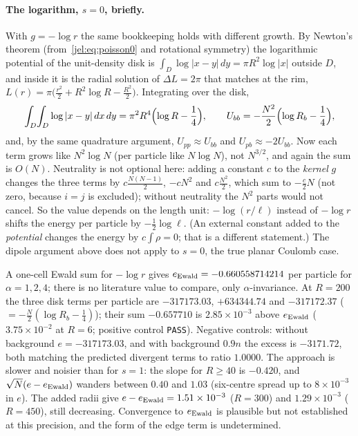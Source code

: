 \paragraph{The logarithm, $s=0$, briefly.} \tierC{} With $g=-\log r$ the same bookkeeping holds with different
growth. By Newton's theorem (from~\eqref{jel:eq:poisson0} and rotational symmetry) the logarithmic potential of the
unit-density disk is $\int_D\log|x-y|\,dy=\pi R^2\log|x|$ outside $D$, and inside it is the radial solution of
$\Delta L=2\pi$ that matches at the rim, $L(r)=\pi\bigl(\frac{r^2}2+R^2\log R-\frac{R^2}2\bigr)$. Integrating over the
disk,
\[
\int_D\!\int_D\log|x-y|\,dx\,dy=\pi^2R^4\Bigl(\log R-\frac14\Bigr),\qquad
U_{bb}=-\frac{N^2}2\Bigl(\log R_b-\frac14\Bigr),
\]
and, by the same quadrature argument, $U_{pp}\approx U_{bb}$ and $U_{pb}\approx-2U_{bb}$. Now each term grows like
$N^2\log N$ (per particle like $N\log N$), not $N^{3/2}$, and again the sum is $O(N)$. Neutrality is not optional here:
adding a constant $c$ to the \emph{kernel} $g$ changes the three terms by $c\frac{N(N-1)}2$, $-cN^2$ and $c\frac{N^2}2$,
which sum to $-\frac c2N$ (not zero, because $i=j$ is excluded); without neutrality the $N^2$ parts would not cancel.
So the value depends on the length unit: $-\log(r/\ell)$ instead of $-\log r$ shifts the energy per particle by
$-\frac12\log\ell$. (An external constant added to the \emph{potential} changes the energy by $c\int\rho=0$; that is a
different statement.) The dipole argument above does not apply to $s=0$, the true planar Coulomb case.

\begin{numbox}[: the logarithm ($s=0$, Tier X)]
A one-cell Ewald sum for $-\log r$ gives $e_{\rm Ewald}=-0.660558714214$ per particle for $\alpha=1,2,4$; there is no
literature value to compare, only $\alpha$-invariance. At $R=200$ the three disk terms per particle are $-317173.03$,
$+634344.74$ and $-317172.37$ ($=-\frac N2(\log R_b-\frac14)$); their sum $-0.657710$ is $2.85\times10^{-3}$ above
$e_{\rm Ewald}$ ($3.75\times10^{-2}$ at $R=6$; positive control \texttt{PASS}). Negative controls: without background
$e=-317173.03$, and with background $0.9n$ the excess is $-3171.72$, both matching the predicted divergent terms to
ratio $1.0000$. The approach is slower and noisier than for $s=1$: the slope for $R\ge40$ is $-0.420$, and
$\sqrt N(e-e_{\rm Ewald})$ wanders between $0.40$ and $1.03$ (six-centre spread up to $8\times10^{-3}$ in $e$). The added
radii give $e-e_{\rm Ewald}=1.51\times10^{-3}$ ($R=300$) and $1.29\times10^{-3}$ ($R=450$), still decreasing. Convergence
to $e_{\rm Ewald}$ is plausible but not established at this precision, and the form of the edge term is undetermined.
\end{numbox}

